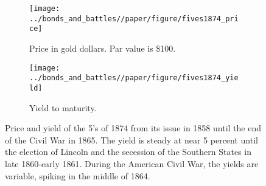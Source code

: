 \begin{figure}[!]
  \centering
  \begin{subfigure}[b]{\linewidth}
   \texttt{[image: ../bonds\_and\_battles//paper/figure/fives1874\_price]}
  \caption{Price in gold dollars. Par value is \$100.}
  \label{fig:fives1874_price}
\end{subfigure}
\begin{subfigure}[b]{\linewidth}
   \texttt{[image: ../bonds\_and\_battles//paper/figure/fives1874\_yield]}
  \caption{Yield to maturity.}
  \label{fig:fives1874_yield}
\end{subfigure}
\caption[Price and yield of the 5's of 1874, 1858-1865]{Price and yield of the 5's of 1874 from its issue in 1858 until the end of the Civil War in 1865.
The yield is steady at near 5 percent until the election of Lincoln and the secession of the Southern States in late 1860-early 1861.
During the American Civil War, the yields are variable, spiking in the middle of 1864.
 }
\label{fig:fives1874_yield_price}
\end{figure}


